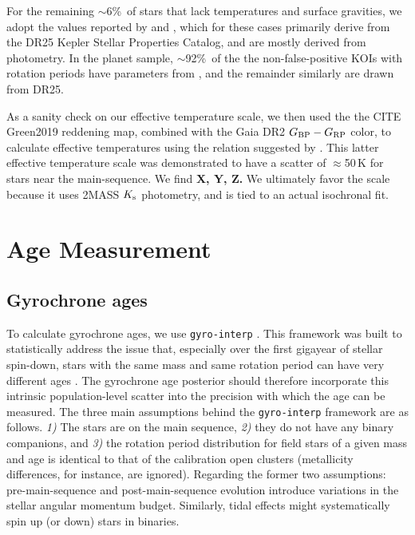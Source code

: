 \documentclass[11pt,twocolumn,tighten]{aastex63}
\newcommand{\fracstarswithprotwithoutbtwenty}{{$\sim$6\%}}
\newcommand{\frackoisnofpwithprotwithbtwenty}{{$\sim$92\%}}
\begin{document}
For the remaining \fracstarswithprotwithoutbtwenty\ of stars that lack
temperatures and surface gravities, we adopt the values reported by
\citet{Santos_2019} and \citet{Santos_2021}, which for these cases
primarily derive from the \citet{Mathur_2017} DR25 Kepler Stellar
Properties Catalog, and are mostly derived from photometry.  In the
planet sample, \frackoisnofpwithprotwithbtwenty\ of the the
non-false-positive KOIs with rotation periods have parameters from
\citet{Berger_2020a_catalog}, and the remainder similarly are drawn
from DR25. 

As a sanity check on our effective temperature scale, we then used the 
the CITE Green2019 reddening map, combined with the Gaia DR2 $G_{\rm
BP}-G_{\rm RP}$ color, to calculate effective temperatures using the
relation suggested by \citet{Curtis_2020}.
This latter effective temperature scale was demonstrated to have a 
scatter of $\approx$50\,K for stars near the main-sequence.
We find {\bf X, Y, Z.}
We ultimately favor the \citet{Berger_2020a_catalog} scale
because it uses 2MASS $K_{\rm s}$ photometry, and is tied to an actual
isochronal fit.




\section{Age Measurement}
\label{sec:agemethod}

\subsection{Gyrochrone ages}
To calculate gyrochrone ages, we use \texttt{gyro-interp}
\citep{Bouma_2023}.  This framework was built to statistically address
the issue that, especially over the first gigayear of stellar
spin-down, stars with the same mass and same rotation period can have
very different ages \citep[e.g.][]{Curtis_2019_ngc6811}.  The
gyrochrone age posterior should therefore incorporate this intrinsic
population-level scatter into the precision with which the age can be
measured.  The three main assumptions behind the \texttt{gyro-interp}
framework are as follows.  {\it 1)} The stars are on the main
sequence, {\it 2)} they do not have any binary companions,
and {\it 3)} the rotation period distribution
for field stars of a given mass and age is identical to that of
the calibration open clusters (metallicity differences, for instance, are
ignored).  
Regarding the former two assumptions:
pre-main-sequence and post-main-sequence evolution introduce
variations in the stellar angular momentum budget.  Similarly, tidal
effects might systematically spin up (or down) stars in binaries.
\end{document}
